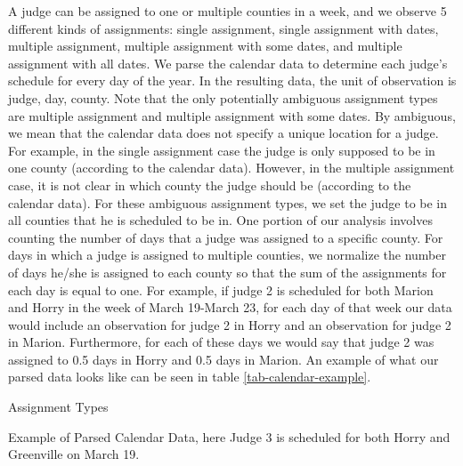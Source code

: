\documentclass[11pt]{article}
\theoremstyle{ModifiedStyle}
\begin{document}
      A judge can be assigned to one or multiple counties in a week, and we observe 5 different kinds of assignments: single assignment, single assignment with dates, multiple assignment, multiple assignment with some dates, and multiple assignment with all dates. We parse the calendar data to determine each judge's schedule for every day of the year. In the resulting data, the unit of observation is judge, day, county. Note that the only potentially ambiguous assignment types are multiple assignment and multiple assignment with some dates. By ambiguous, we mean that the calendar data does not specify a unique location for a judge. For example, in the single assignment case the judge is only supposed to be in one county (according to the calendar data). However, in the multiple assignment case, it is not clear in which county the judge should be (according to the calendar data). For these ambiguous assignment types, we set the judge to be in all counties that he is scheduled to be in. One portion of our analysis involves counting the number of days that a judge was assigned to a specific county. For days in which a judge is assigned to multiple counties, we normalize the number of days he/she is assigned to each county so that the sum of the assignments for each day is equal to one. For example, if judge 2 is scheduled for both Marion and Horry in the week of March 19-March 23, for each day of that week our data would include an observation for judge 2 in Horry and an observation for judge 2 in Marion. Furthermore, for each of these days we would say that judge 2 was assigned to 0.5 days in Horry and 0.5 days in Marion. An example of what our parsed data looks like can be seen in table \ref{tab-calendar-example}.

      \begin{table}[H]
        \centering
        \caption{Assignment Types}
        \label{tab-assignments}
        
      \end{table}

      \begin{table}[H]
        \centering
        \caption{Example of Parsed Calendar Data, here Judge 3 is scheduled for both Horry and Greenville on March 19.}
        \label{tab-calendar-example}
        
      \end{table}
\end{document}
